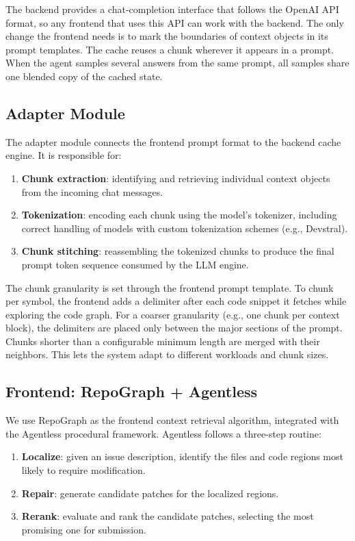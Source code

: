 The backend provides a chat-completion interface that follows the OpenAI API format, so any frontend that uses this API can work with the backend. The only change the frontend needs is to mark the boundaries of context objects in its prompt templates. The cache reuses a chunk wherever it appears in a prompt. When the agent samples several answers from the same prompt, all samples share one blended copy of the cached state.

\subsection{Adapter Module}
\label{sec:design_adapter}

The adapter module connects the frontend prompt format to the backend cache engine. It is responsible for:
\begin{enumerate}
    \item \textbf{Chunk extraction}: identifying and retrieving individual context objects from the incoming chat messages.
    \item \textbf{Tokenization}: encoding each chunk using the model's tokenizer, including correct handling of models with custom tokenization schemes (e.g., Devstral).
    \item \textbf{Chunk stitching}: reassembling the tokenized chunks to produce the final prompt token sequence consumed by the LLM engine.
\end{enumerate}

The chunk granularity is set through the frontend prompt template. To chunk per symbol, the frontend adds a delimiter after each code snippet it fetches while exploring the code graph. For a coarser granularity (e.g., one chunk per context block), the delimiters are placed only between the major sections of the prompt. Chunks shorter than a configurable minimum length are merged with their neighbors. This lets the system adapt to different workloads and chunk sizes.

\subsection{Frontend: RepoGraph + Agentless}
\label{sec:design_arch_frontend}

We use RepoGraph as the frontend context retrieval algorithm, integrated with the Agentless procedural framework. Agentless follows a three-step routine:
\begin{enumerate}
    \item \textbf{Localize}: given an issue description, identify the files and code regions most likely to require modification.
    \item \textbf{Repair}: generate candidate patches for the localized regions.
    \item \textbf{Rerank}: evaluate and rank the candidate patches, selecting the most promising one for submission.
\end{enumerate}

